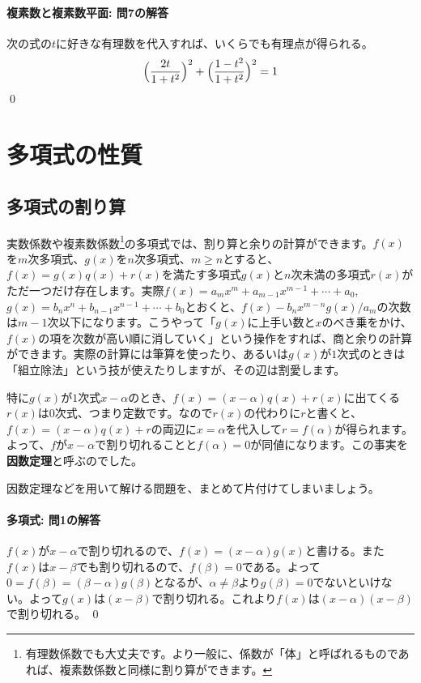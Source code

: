 \paragraph{複素数と複素数平面: 問7の解答} 
次の式の$t$に好きな有理数を代入すれば、いくらでも有理点が得られる。
\[
\Bigl(\frac{2t}{1+t^2}\Bigr)^2 + \Bigl(\frac{1-t^2}{1+t^2}\Bigr)^2 = 1
\]
\qed 

\section{多項式の性質}

\subsection{多項式の割り算}

実数係数や複素数係数\footnote{有理数係数でも大丈夫です。より一般に、係数が「体」と呼ばれるものであれば、複素数係数と同様に割り算ができます。}の多項式では、割り算と余りの計算ができます。$f(x)$を$m$次多項式、$g(x)$を$n$次多項式、$m\geq n$とすると、$f(x)=g(x)q(x)+r(x)$を満たす多項式$g(x)$と$n$次未満の多項式$r(x)$がただ一つだけ存在します。実際$f(x) = a_m x^m + a_{m-1}x^{m-1} + \cdots + a_0$, $g(x) = b_n x^n + b_{n-1} x^{n-1} +\cdots + b_0$とおくと、$f(x) - b_n x^{m-n} g(x) / a_m$の次数は$m-1$次以下になります。こうやって「$g(x)$に上手い数と$x$のべき乗をかけ、$f(x)$の項を次数が高い順に消していく」という操作をすれば、商と余りの計算ができます。実際の計算には筆算を使ったり、あるいは$g(x)$が$1$次式のときは「組立除法」という技が使えたりしますが、その辺は割愛します。

特に$g(x)$が$1$次式$x-\alpha$のとき、$f(x)=(x-\alpha)q(x)+r(x)$に出てくる$r(x)$は$0$次式、つまり定数です。なので$r(x)$の代わりに$r$と書くと、$f(x)=(x-\alpha)q(x)+r$の両辺に$x=\alpha$を代入して$r=f(\alpha)$が得られます。よって、$f$が$x-\alpha$で割り切れることと$f(\alpha)=0$が同値になります。この事実を\textbf{因数定理}と呼ぶのでした。

因数定理などを用いて解ける問題を、まとめて片付けてしまいましょう。


\paragraph{多項式: 問1の解答}
$f(x)$が$x-\alpha$で割り切れるので、$f(x)=(x-\alpha)g(x)$と書ける。また$f(x)$は$x-\beta$でも割り切れるので、$f(\beta)=0$である。よって$0=f(\beta)=(\beta-\alpha)g(\beta)$となるが、$\alpha\neq\beta$より$g(\beta)=0$でないといけない。よって$g(x)$は$(x-\beta)$で割り切れる。これより$f(x)$は$(x-\alpha)(x-\beta)$で割り切れる。 \qed

